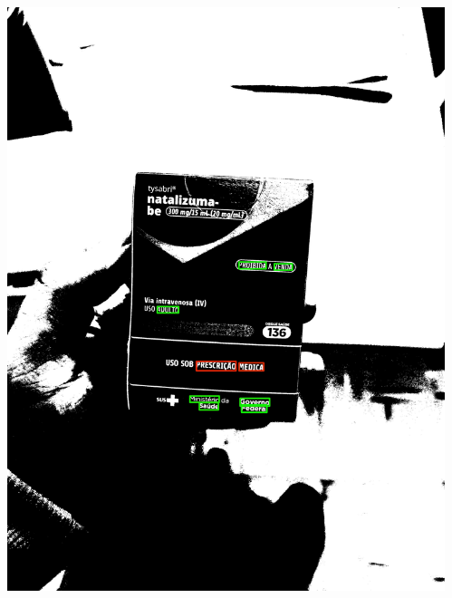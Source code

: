 \begin{frame}
\begin{columns}
\begin{column}{0.24\textwidth}
			\includegraphics[height=0.35\textheight]{../pictures/tysabri_gray_thresh_boxes.jpg}
		\end{column}
		\begin{column}{0.24\textwidth}\centering

\end{column}
\end{columns}
\end{frame}
